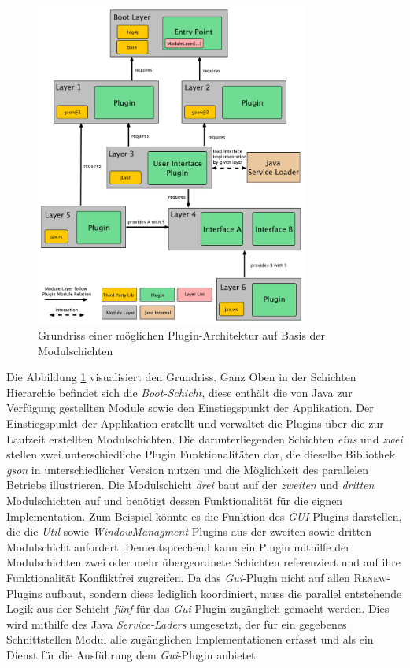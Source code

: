 	\begin{figure}[t]
		   \centering
		   \captionsetup{justification=centering}
		   \includegraphics[width=0.8\textwidth]{material/images/ModulLayerDepsDraw.pdf}
		   \caption{Grundriss einer möglichen Plugin-Architektur auf Basis der Modulschichten}
		   \label{fig:ModSchichtKonzept}
	\end{figure}
\newpage	
	Die Abbildung \ref{fig:ModSchichtKonzept} visualisiert den Grundriss. Ganz Oben in der Schichten Hierarchie befindet sich die \textit{Boot-Schicht}, diese enthält die von Java zur Verfügung gestellten Module sowie den Einstiegspunkt der Applikation. Der Einstiegspunkt der Applikation erstellt und verwaltet die Plugins über die zur Laufzeit erstellten Modulschichten. Die darunterliegenden Schichten \textit{eins} und \textit{zwei} stellen zwei unterschiedliche Plugin Funktionalitäten dar, die dieselbe Bibliothek \textit{gson} in unterschiedlicher Version nutzen und die Möglichkeit des parallelen Betriebs illustrieren. Die Modulschicht \textit{drei} baut auf der \textit{zweiten} und \textit{dritten} Modulschichten auf und benötigt dessen Funktionalität für die eignen Implementation. Zum Beispiel könnte es die Funktion des \textit{GUI}-Plugins darstellen, die die \textit{Util} sowie \textit{WindowManagment} Plugins aus der zweiten sowie dritten Modulschicht anfordert. Dementsprechend kann ein Plugin mithilfe der Modulschichten zwei oder mehr übergeordnete Schichten referenziert und auf ihre Funktionalität Konfliktfrei zugreifen.\newline
	Da das \textit{Gui}-Plugin nicht auf allen \textsc{Renew}-Plugins aufbaut, sondern diese lediglich koordiniert, muss die parallel entstehende Logik aus der Schicht \textit{fünf} für das \textit{Gui}-Plugin zugänglich gemacht werden. Dies wird mithilfe des Java \textit{Service-Laders} umgesetzt, der für ein gegebenes Schnittstellen Modul alle zugänglichen Implementationen erfasst und als ein Dienst für die Ausführung dem \textit{Gui}-Plugin anbietet.\bigbreak

